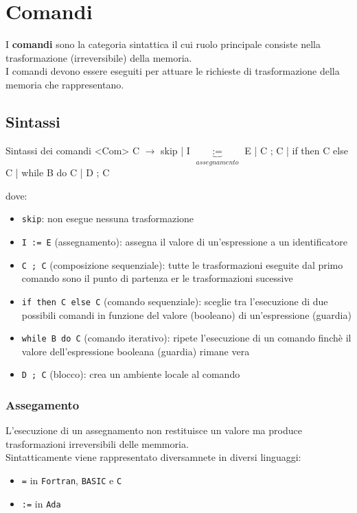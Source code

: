 
\chapter{Comandi}
I \textcolor{colore}{\textbf{comandi}} sono la categoria sintattica il cui ruolo principale consiste nella trasformazione (irreversibile) della memoria.\\[0.2ex]
I comandi devono essere eseguiti per attuare le richieste di trasformazione della memoria che rappresentano.

\section{Sintassi}
\begin{bnfcode}{Sintassi dei comandi}
    <Com>
    C $\rightarrow$ skip | I $\underbrace{:=}_{assegnamento}$ E | C ; C | if then C else C | while B do C | D ; C
\end{bnfcode}

dove:
\begin{itemize}[label=$\triangleright$, itemsep=\smallskipamount]
    \item \texttt{skip}: non esegue nessuna trasformazione
    \item \texttt{I := E} (assegnamento): assegna il valore di un'espressione a un identificatore
    \item \texttt{C ; C} (composizione sequenziale): tutte le trasformazioni eseguite dal primo comando sono il punto di partenza er le trasformazioni sucessive
    \item \texttt{if then C else C} (comando sequenziale): sceglie tra l'esecuzione di due possibili comandi in funzione del valore (booleano) di un'espressione (guardia)
    \item \texttt{while B do C} (comando iterativo): ripete l'esecuzione di un comando finchè il valore dell'espressione booleana (guardia) rimane vera
    \item \texttt{D ; C} (blocco): crea un ambiente locale al comando
\end{itemize}

\subsection{Assegamento}
L'esecuzione di un assegnamento non restituisce un valore ma produce trasformazioni irreversibili delle memmoria.\\[0.2ex]
Sintatticamente viene rappresentato diversamnete in diversi linguaggi:
\begin{itemize}[label=$\diamond$, itemsep=\smallskipamount]
    \item \texttt{=} in \texttt{Fortran}, \texttt{BASIC} e \texttt{C}
    \item \texttt{:=} in \texttt{Ada}
\end{itemize}


